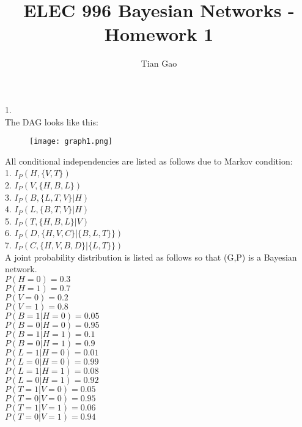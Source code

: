 \documentclass[a4paper]{article}
\title{ELEC 996 Bayesian Networks - Homework 1}
\author{Tian Gao}
\begin{document}
\maketitle

1. \\
The DAG looks like this:\\

\begin{figure}[htbp]
\centering
\texttt{[image: graph1.png]}
\end{figure}

All conditional independencies are listed as follows due to Markov condition:\\
1. $I_P(H, \{V, T\})$\\
2. $I_P(V, \{H, B, L\})$\\
3. $I_P(B, \{L, T, V\} | H)$\\
4. $I_P(L, \{B, T, V\} | H)$\\
5. $I_P(T, \{H, B, L\} | V)$\\
6. $I_P(D, \{H, V, C\} | \{B, L, T\}\})$\\
7. $I_P(C, \{H, V, B, D\} | \{L, T\}\})$\\

A joint probability distribution is listed as follows so that (G,P) is a Bayesian network.\\
$P(H=0) = 0.3$\\
$P(H=1) = 0.7$\\

$P(V=0) = 0.2$\\
$P(V=1) = 0.8$\\

$P(B=1|H=0) = 0.05$\\
$P(B=0|H=0) = 0.95$\\
$P(B=1|H=1) = 0.1$\\
$P(B=0|H=1) = 0.9$\\

$P(L=1|H=0) = 0.01$\\
$P(L=0|H=0) = 0.99$\\
$P(L=1|H=1) = 0.08$\\
$P(L=0|H=1) = 0.92$\\

$P(T=1|V=0) = 0.05$\\
$P(T=0|V=0) = 0.95$\\
$P(T=1|V=1) = 0.06$\\
$P(T=0|V=1) = 0.94$\\
\end{document}
